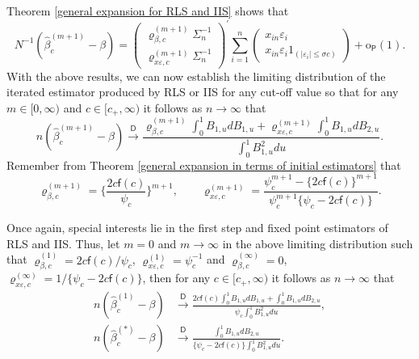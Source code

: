 \documentclass[11pt, letterpaper]{article}
\numberwithin{algorithm}{section}
\numberwithin{assumption}{section}
\numberwithin{lemma}{section}
\numberwithin{theorem}{section}
\numberwithin{corollary}{section}
\numberwithin{remark}{section}
\numberwithin{equation}{section}
\numberwithin{figure}{section}
\numberwithin{table}{section}
\begin{document}
Theorem \ref{general expansion for RLS and IIS} shows that
\begin{equation*}
N^{-1} (\widehat{\beta}_{c}^{(m + 1)} - \beta) =
\begin{pmatrix}
\varrho_{\beta, c}^{(m + 1)} \Sigma_{n}^{-1} \\
\varrho_{x \varepsilon, c}^{(m + 1)} \Sigma_{n}^{-1}
\end{pmatrix}^{\prime}
\sum_{i = 1}^{n}
\begin{pmatrix}
x_{in} \varepsilon_{i} \\
x_{in} \varepsilon_{i} 1_{(|\varepsilon_{i}| \le \sigma c)}
\end{pmatrix}
+ \mathrm{o}_{\mathsf{P}}(1).
\end{equation*}
With the above results, we can now establish the limiting distribution of the iterated estimator produced by RLS or IIS for any cut-off value so that for any $m \in [0, \infty)$ and $c \in [c_{+}, \infty)$ it follows as $n \to \infty$ that
\begin{equation*}
n (\widehat{\beta}_{c}^{(m + 1)} - \beta) \overset{\mathsf{D}}{\to} \frac{\varrho_{\beta, c}^{(m + 1)} \int_{0}^{1} B_{1, u} dB_{1, u} + \varrho_{x \varepsilon, c}^{(m + 1)} \int_{0}^{1} B_{1, u} dB_{2, u}}{\int_{0}^{1} B_{1, u}^{2} du}.
\end{equation*}
Remember from Theorem \ref{general expansion in terms of initial estimators} that
\begin{equation*}
\varrho_{\beta, c}^{(m + 1)} = \{ \frac{2 c \mathsf{f}(c)}{\psi_{c}} \}^{m + 1},  \qquad \varrho_{x \varepsilon, c}^{(m + 1)} = \frac{\psi_{c}^{m + 1} - \{ 2 c \mathsf{f}(c) \}^{m + 1}}{\psi_{c}^{m + 1} \{ \psi_{c} - 2 c \mathsf{f}(c) \}}.
\end{equation*}

Once again, special interests lie in the first step and fixed point estimators of RLS and IIS. Thus, let $m = 0$ and $m \to \infty$ in the above limiting distribution such that $\varrho_{\beta, c}^{(1)} = 2 c \mathsf{f}(c) / \psi_{c}$, $\varrho_{x \varepsilon, c}^{(1)} = \psi_{c}^{-1}$ and $\varrho_{\beta, c}^{(\infty)} = 0$, $\varrho_{x \varepsilon, c}^{(\infty)} = 1 / \{ \psi_{c} - 2 c \mathsf{f}(c) \}$, then for any $c \in [c_{+}, \infty)$ it follows as $n \to \infty$ that
\begin{align*}
n (\widehat{\beta}_{c}^{(1)} - \beta) & \overset{\mathsf{D}}{\to} \frac{2 c \mathsf{f}(c) \int_{0}^{1} B_{1, u} dB_{1, u} +  \int_{0}^{1} B_{1, u} dB_{2, u}}{\psi_{c}  \int_{0}^{1} B_{1, u}^{2} du}, \\
n (\widehat{\beta}_{c}^{(\ast)} - \beta) & \overset{\mathsf{D}}{\to} \frac{\int_{0}^{1} B_{1, u} dB_{2, u}}{\{ \psi_{c} - 2 c \mathsf{f}(c) \} \int_{0}^{1} B_{1, u}^{2} du}.
\end{align*}
\end{document}
